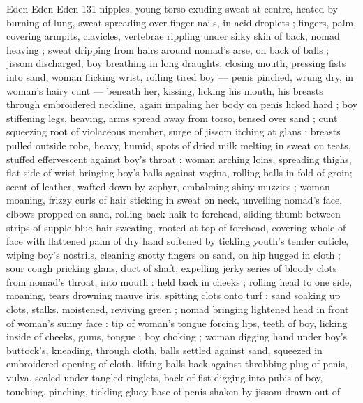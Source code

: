 Eden Eden Eden 131
nipples, young torso exuding sweat at centre, heated by burning of
lung, sweat spreading over finger-nails, in acid droplets ; fingers,
palm, covering armpits, clavicles, vertebrae rippling under silky skin
of back, nomad heaving ; sweat dripping from hairs around nomad’s
arse, on back of balls ; jissom discharged, boy breathing in long
draughts, closing mouth, pressing fists into sand, woman flicking
wrist, rolling tired boy — penis pinched, wrung dry, in woman's hairy
cunt — beneath her, kissing, licking his mouth, his breasts through
embroidered neckline, again impaling her body on penis licked hard
; boy stiffening legs, heaving, arms spread away from torso, tensed
over sand ; cunt squeezing root of violaceous member, surge of
jissom itching at glans ; breasts pulled outside robe, heavy, humid,
spots of dried milk melting in sweat on teats, stuffed effervescent
against boy's throat ; woman arching loins, spreading thighs, flat
side of wrist bringing boy's balls against vagina, rolling balls in fold
of groin; scent of leather, wafted down by zephyr, embalming shiny
muzzies ; woman moaning, frizzy curls of hair sticking in sweat on
neck, unveiling nomad’s face, elbows propped on sand, rolling back
haik to forehead, sliding thumb between strips of supple blue hair
sweating, rooted at top of forehead, covering whole of face with
flattened palm of dry hand softened by tickling youth's tender
cuticle, wiping boy's nostrils, cleaning snotty fingers on sand, on hip
hugged in cloth ; sour cough pricking glans, duct of shaft, expelling
jerky series of bloody clots from nomad's throat, into mouth : held
back in cheeks ; rolling head to one side, moaning, tears drowning
mauve iris, spitting clots onto turf : sand soaking up clots, stalks.
moistened, reviving green ; nomad bringing lightened head in front
of woman's sunny face : tip of woman's tongue forcing lips, teeth of
boy, licking inside of cheeks, gums, tongue ; boy choking ; woman
digging hand under boy's buttock’s, kneading, through cloth, balls
settled against sand, squeezed in embroidered opening of cloth.
lifting balls back against throbbing plug of penis, vulva, sealed under
tangled ringlets, back of fist digging into pubis of boy, touching.
pinching, tickling gluey base of penis shaken by jissom drawn out of

